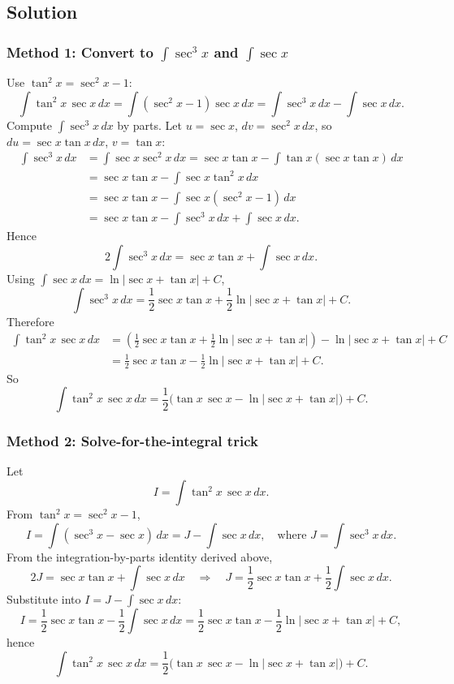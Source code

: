 \documentclass[12pt]{article}
\begin{document}
\subsection*{Solution}

\subsubsection*{Method 1: Convert to \(\int \sec^{3}x\) and \(\int \sec x\)}

Use \(\tan^{2}x=\sec^{2}x-1\):
\[
\int \tan^{2}x\,\sec x\,dx
=\int (\sec^{2}x-1)\sec x\,dx
=\int \sec^{3}x\,dx-\int \sec x\,dx.
\]
Compute \(\int \sec^{3}x\,dx\) by parts. Let \(u=\sec x\), \(dv=\sec^{2}x\,dx\), so \(du=\sec x\tan x\,dx\), \(v=\tan x\):
\begin{align*}
\int \sec^{3}x\,dx
&=\int \sec x\sec^{2}x\,dx
=\sec x\tan x-\int \tan x(\sec x\tan x)\,dx\\
&=\sec x\tan x-\int \sec x\tan^{2}x\,dx\\
&=\sec x\tan x-\int \sec x(\sec^{2}x-1)\,dx\\
&=\sec x\tan x-\int \sec^{3}x\,dx+\int \sec x\,dx.
\end{align*}
Hence
\[
2\int \sec^{3}x\,dx=\sec x\tan x+\int \sec x\,dx.
\]
Using \(\int \sec x\,dx=\ln|\sec x+\tan x|+C\),
\[
\int \sec^{3}x\,dx=\frac{1}{2}\sec x\tan x+\frac{1}{2}\ln|\sec x+\tan x|+C.
\]
Therefore
\begin{align*}
\int \tan^{2}x\,\sec x\,dx
&=\left(\frac{1}{2}\sec x\tan x+\frac{1}{2}\ln|\sec x+\tan x|\right)-\ln|\sec x+\tan x|+C\\
&=\frac{1}{2}\sec x\tan x-\frac{1}{2}\ln|\sec x+\tan x|+C.
\end{align*}
So
\[
\boxed{\int \tan^{2}x\,\sec x\,dx=\frac{1}{2}\Big(\tan x\,\sec x-\ln|\sec x+\tan x|\Big)+C.}
\]

\subsubsection*{Method 2: Solve-for-the-integral trick}

Let
\[
I=\int \tan^{2}x\,\sec x\,dx.
\]
From \(\tan^{2}x=\sec^{2}x-1\),
\[
I=\int (\sec^{3}x-\sec x)\,dx = J-\int \sec x\,dx,
\quad\text{where } J=\int \sec^{3}x\,dx.
\]
From the integration-by-parts identity derived above,
\[
2J=\sec x\tan x+\int \sec x\,dx
\quad\Rightarrow\quad
J=\frac{1}{2}\sec x\tan x+\frac{1}{2}\int \sec x\,dx.
\]
Substitute into \(I=J-\int \sec x\,dx\):
\[
I=\frac{1}{2}\sec x\tan x-\frac{1}{2}\int \sec x\,dx
=\frac{1}{2}\sec x\tan x-\frac{1}{2}\ln|\sec x+\tan x|+C,
\]
hence
\[
\boxed{\int \tan^{2}x\,\sec x\,dx=\frac{1}{2}\Big(\tan x\,\sec x-\ln|\sec x+\tan x|\Big)+C.}
\]
\end{document}
